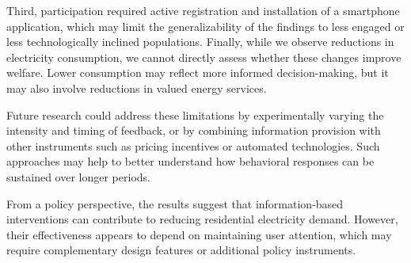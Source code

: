 Third, participation required active registration and installation of a smartphone application, which may limit the generalizability of the findings to less engaged or less technologically inclined populations. Finally, while we observe reductions in electricity consumption, we cannot directly assess whether these changes improve welfare. Lower consumption may reflect more informed decision-making, but it may also involve reductions in valued energy services.

Future research could address these limitations by experimentally varying the intensity and timing of feedback, or by combining information provision with other instruments such as pricing incentives or automated technologies. Such approaches may help to better understand how behavioral responses can be sustained over longer periods.

From a policy perspective, the results suggest that information-based interventions can contribute to reducing residential electricity demand. However, their effectiveness appears to depend on maintaining user attention, which may require complementary design features or additional policy instruments.